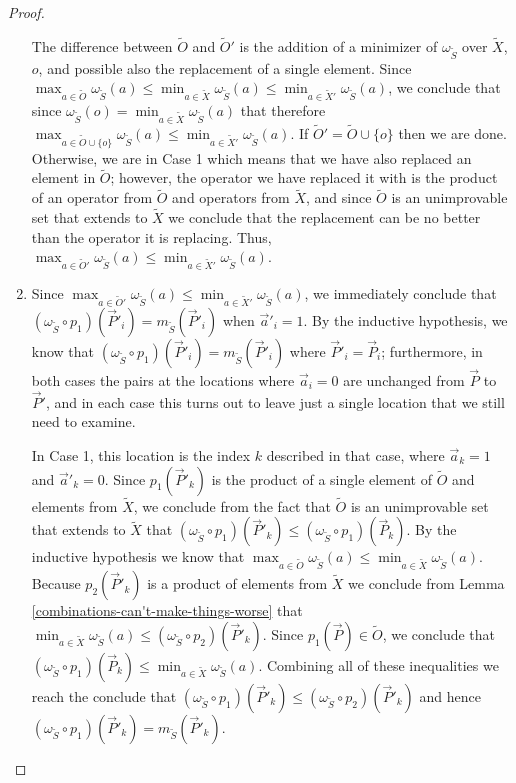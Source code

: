 \documentclass{amsbook}
\theoremstyle{plain}
\theoremstyle{definition}
\theoremstyle{remark}
\newcommand{\lst}{\vec}
\newcommand{\set}{\tilde}
\newcommand{\om}{\omega}
\begin{document}
\begin{proof}
\begin{enumerate}
The difference between $\set O$ and $\set O'$ is the addition of a minimizer of $\om_{\set S}$ over $\set X$, $o$, and possible also the replacement of a single element.  Since $\max_{a\in\set O}\om_{\set S}(a)\le\min_{a\in\set X}\om_{\set S}(a)\le\min_{a\in\set X'}\om_{\set S}(a)$, we conclude that since $\om_{\set S}(o)=\min_{a\in\set X}\om_{\set S}(a)$ that therefore $\max_{a\in\set O\cup\{o\}}\om_{\set S}(a)\le\min_{a\in\set X'}\om_{\set S}(a)$.  If $\set O'=\set O\cup\{o\}$ then we are done.  Otherwise, we are in Case 1 which means that we have also replaced an element in $\set O$;  however, the operator we have replaced it with is the product of an operator from $\set O$ and operators from $\set X$, and since $\set O$ is an unimprovable set that extends to $\set X$ we conclude that the replacement can be no better than the operator it is replacing.  Thus, $\max_{a\in\set O'}\om_{\set S}(a)\le\min_{a\in\set X'}\om_{\set S}(a)$.
\item

Since $\max_{a\in\set O'}\om_{\set S}(a)\le\min_{a\in\set X'}\om_{\set S}(a)$, we immediately conclude that $(\om_{\set S}\circ p_1)(\lst P'_i)=m_{\set S}(\lst P'_i)$ when $\lst a'_i=1$.  By the inductive hypothesis, we know that $(\om_{\set S}\circ p_1)(\lst P'_i)=m_{\set S}(\lst P'_i)$ where $\lst P'_i=\lst P_i$;  furthermore, in both cases the pairs at the locations where $\lst a_i=0$ are unchanged from $\lst P$ to $\lst P'$, and in each case this turns out to leave just a single location that we still need to examine.

In Case 1, this location is the index $k$ described in that case, where $\lst a_k=1$ and $\lst a'_k=0$.  Since $p_1(\lst P'_k)$ is the product of a single element of $\set O$ and elements from $\set X$, we conclude from the fact that $\set O$ is an unimprovable set that extends to $\set X$ that $(\om_{\set S}\circ p_1)(\lst P'_k)\le(\om_{\set S}\circ p_1)(\lst P_k)$.  By the inductive hypothesis we know that $\max_{a\in\set O}\om_{\set S}(a)\le\min_{a\in\set X}\om_{\set S}(a)$.  Because $p_2(\lst P'_k)$ is a product of elements from $\set X$ we conclude from Lemma \ref{combinations-can't-make-things-worse} that $\min_{a\in\set X}\om_{\set S}(a)\le (\om_{\set S}\circ p_2)(\lst P'_k)$.  Since $p_1(\lst P)\in\set O$, we conclude that $(\om_{\set S}\circ p_1)(\lst P_k)\le\min_{a\in\set X}\om_{\set S}(a)$.  Combining all of these inequalities we reach the conclude that $(\om_{\set S}\circ p_1)(\lst P'_k)\le(\om_{\set S}\circ p_2)(\lst P'_k)$ and hence $(\om_{\set S}\circ p_1)(\lst P'_k)=m_{\set S}(\lst P'_k)$.


\end{enumerate}
\end{proof}
\end{document}
